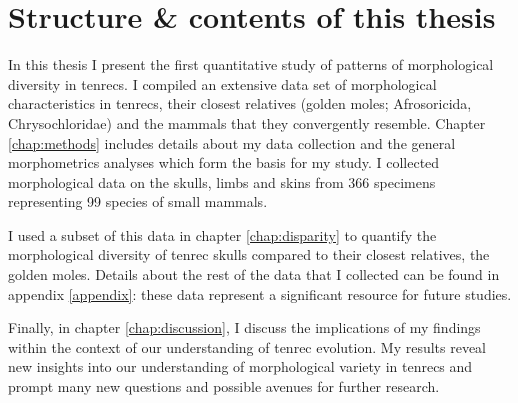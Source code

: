 \section{Structure \& contents of this thesis}
	
	In this thesis I present the first quantitative study of patterns of morphological diversity in tenrecs. I compiled an extensive data set of morphological characteristics in tenrecs, their closest relatives (golden moles; Afrosoricida, Chrysochloridae) and the mammals that they convergently resemble. Chapter \ref{chap:methods} includes details about my data collection and the general morphometrics analyses which form the basis for my study. I collected morphological data on the skulls, limbs and skins from 366 specimens representing 99 species of small mammals. 
	
	I used a subset of this data in chapter \ref{chap:disparity} to quantify the morphological diversity of tenrec skulls compared to their closest relatives, the golden moles. Details about the rest of the data that I collected can be found in appendix \ref{appendix}: these data represent a significant resource for future studies.

	
	Finally, in chapter \ref{chap:discussion}, I discuss the implications of my findings within the context of our understanding of tenrec evolution. %
 	My results reveal new insights into our understanding of morphological variety in tenrecs and prompt many new questions and possible avenues for further research.


